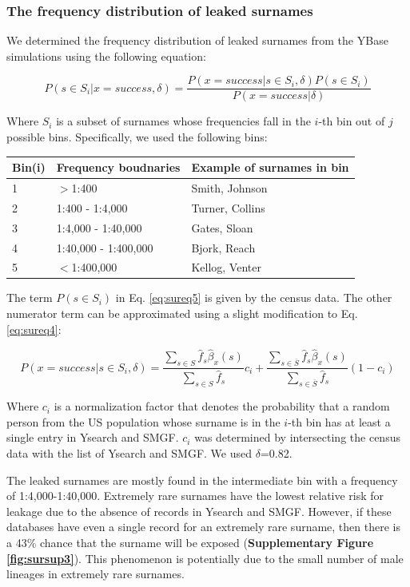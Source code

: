 \subsubsection{The frequency distribution of leaked surnames}
We determined the frequency distribution of leaked surnames from the YBase simulations using the following equation:

\begin{equation}
\label{eq:sureq5}
P(s \in S_i | x = success, \delta) = \frac
{P(x=success | s \in S_i, \delta)P(s \in S_i)}
{P(x=success | \delta)}
\end{equation}

Where $S_i$ is a subset of surnames whose frequencies fall in the $i$-th bin out of $j$ possible bins. Specifically, we used the following bins:

\begin{table}[h!]
\begin{tabular}{|l|l|l|}
\hline
Bin(i) & Frequency boudnaries & Example of surnames in bin \\
\hline
1& 	$>$1:400 &	Smith, Johnson \\
2	&1:400 - 1:4,000	& Turner, Collins\\
3	& 1:4,000 - 1:40,000 & 	Gates, Sloan\\
4	& 1:40,000 - 1:400,000 &	Bjork, Reach \\
5	& $<$1:400,000 &	Kellog, Venter \\
\hline
\end{tabular}
\end{table}

The term $P(s \in S_i)$ in Eq. \ref{eq:sureq5} is given by the census data. The other numerator term can be approximated using a slight modification to Eq. \ref{eq:sureq4}:

\begin{equation}
\label{eq:sureq6}
P(x = success | s \in S_i, \delta) = 
\frac{\sum_{s \in S} \hat{f}_s \hat{\beta}_x(s)}
{\sum_{s \in S}\hat{f}_s}c_i + 
\frac{\sum_{s \in \overline{S}} \hat{f}_s\hat{\beta}_x(s)}
{\sum_{s \in \overline{S}} \hat{f}_s} (1-c_i)
\end{equation}

Where $c_i$ is a normalization factor that denotes the probability that a random person from the US population whose surname is in the $i$-th bin has at least a single entry in Ysearch and SMGF.  $c_i$ was determined by intersecting the census data with the list of Ysearch and SMGF. We used $\delta$=0.82.

The leaked surnames are mostly found in the intermediate bin with a frequency of 1:4,000-1:40,000. Extremely rare surnames have the lowest relative risk for leakage due to the absence of records in Ysearch and SMGF. However, if these databases have even a single record for an extremely rare surname, then there is a 43\% chance that the surname will be exposed (\textbf{Supplementary Figure \ref{fig:sursup3}}). This phenomenon is potentially due to the small number of male lineages in extremely rare surnames.	

